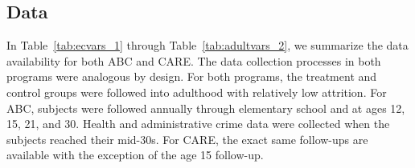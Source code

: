 \begin{appendices}
\subsection{Data} \label{appendix:data}

In Table~\ref{tab:ecvars_1} through Table~\ref{tab:adultvars_2}, we summarize the data availability for both ABC and CARE. The data collection processes in both programs were analogous by design. For both programs, the treatment and control groups were followed into adulthood with relatively low attrition. For ABC, subjects were followed annually through elementary school and at ages 12, 15, 21, and 30. Health and administrative crime data were collected when the subjects reached their mid-30s. For CARE, the exact same follow-ups are available with the exception of the age 15 follow-up.\\

\end{appendices}
